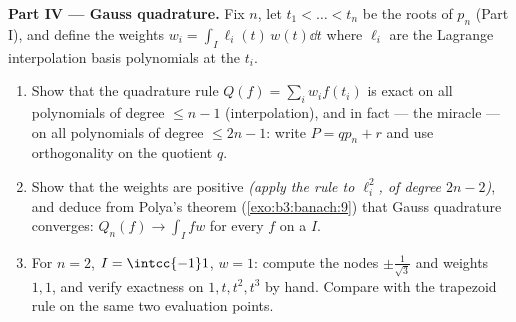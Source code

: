 \begin{problem}
\medskip
\noindent\textbf{Part IV --- Gauss quadrature.} Fix $n$, let
$t_1 < \dots < t_n$ be the roots of $p_n$ (Part I), and define
the weights $w_i = \int_I \ell_i(t)\,w(t)\dd t$ where
$\ell_i$ are the Lagrange interpolation basis polynomials at
the $t_i$.
\begin{enumerate}[resume]
  \item Show that the quadrature rule $Q(f) = \sum_iw_if(t_i)$
        is exact on all polynomials of degree $\leq n - 1$
        (interpolation), and in fact --- the miracle --- on
        all polynomials of degree $\leq 2n - 1$: write $P =
        qp_n + r$ and use orthogonality on the quotient $q$.
  \item Show that the weights are positive
        \emph{(apply the rule to $\ell_i^2$, of degree $2n -
        2$)}, and deduce from Polya's theorem
        (\cref{exo:b3:banach:9}) that Gauss quadrature
        converges: $Q_n(f) \to \int_I fw$ for every 
        $f$ on a  $I$.
  \item For $n = 2$, $I = \intcc{-1}1$, $w = 1$: compute the
        nodes $\pm\frac1{\sqrt3}$ and weights $1, 1$, and
        verify exactness on $1, t, t^2, t^3$ by hand. Compare
        with the trapezoid rule on the same two evaluation
        points.
\end{enumerate}


\end{problem}
